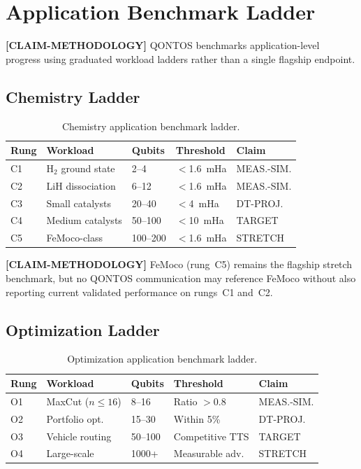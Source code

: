\documentclass[conference]{IEEEtran}
\begin{document}
\section{Application Benchmark Ladder}

\textbf{[CLAIM-METHODOLOGY]} QONTOS benchmarks application-level progress using graduated workload ladders rather than a single flagship endpoint.

\subsection{Chemistry Ladder}

\begin{table}[H]
\centering
\caption{Chemistry application benchmark ladder.}
\label{tab:chem_ladder}
\begin{tabular}{@{}l l l l l@{}}
\toprule
\textbf{Rung} & \textbf{Workload} & \textbf{Qubits} & \textbf{Threshold} & \textbf{Claim} \\
\midrule
C1 & H$_2$ ground state & 2--4 & $<$1.6~mHa & MEAS.-SIM. \\
C2 & LiH dissociation & 6--12 & $<$1.6~mHa & MEAS.-SIM. \\
C3 & Small catalysts & 20--40 & $<$4~mHa & DT-PROJ. \\
C4 & Medium catalysts & 50--100 & $<$10~mHa & TARGET \\
C5 & FeMoco-class & 100--200 & $<$1.6~mHa & STRETCH \\
\bottomrule
\end{tabular}
\end{table}

\textbf{[CLAIM-METHODOLOGY]} FeMoco (rung~C5) remains the flagship stretch benchmark, but no QONTOS communication may reference FeMoco without also reporting current validated performance on rungs~C1 and~C2.

\subsection{Optimization Ladder}

\begin{table}[H]
\centering
\caption{Optimization application benchmark ladder.}
\label{tab:opt_ladder}
\begin{tabular}{@{}l l l l l@{}}
\toprule
\textbf{Rung} & \textbf{Workload} & \textbf{Qubits} & \textbf{Threshold} & \textbf{Claim} \\
\midrule
O1 & MaxCut ($n \leq 16$) & 8--16 & Ratio $> 0.8$ & MEAS.-SIM. \\
O2 & Portfolio opt. & 15--30 & Within 5\% & DT-PROJ. \\
O3 & Vehicle routing & 50--100 & Competitive TTS & TARGET \\
O4 & Large-scale & 1000+ & Measurable adv. & STRETCH \\
\bottomrule
\end{tabular}
\end{table}
\end{document}
